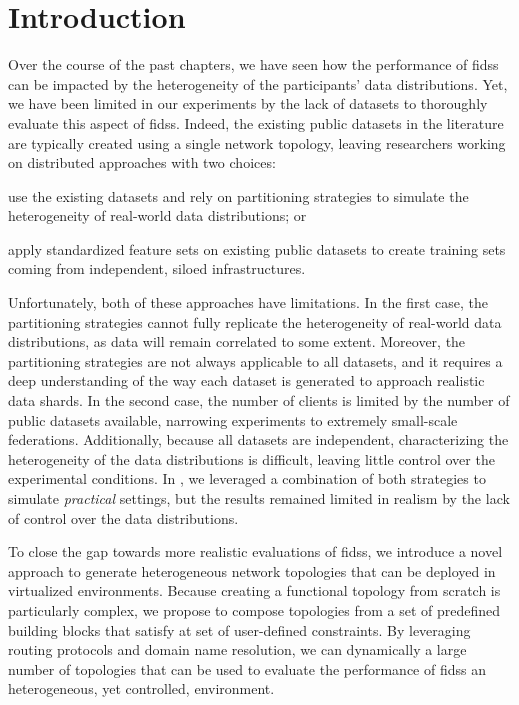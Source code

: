 \section{Introduction\label{sec:topologies.intro}}



Over the course of the past chapters, we have seen how the performance of \glspl{fids} can be impacted by the heterogeneity of the participants' data distributions.
Yet, we have been limited in our experiments by the lack of datasets to thoroughly evaluate this aspect of \glspl{fids}.
Indeed, the existing public datasets in the literature are typically created using a single network topology, leaving researchers working on distributed approaches with two choices:
\begin{enumerate*}[(i)]
    \item use the existing datasets and rely on partitioning strategies to simulate the heterogeneity of real-world data distributions; or
    \item apply standardized feature sets on existing public datasets to create training sets coming from independent, siloed infrastructures.
\end{enumerate*}

Unfortunately, both of these approaches have limitations.
In the first case, the partitioning strategies cannot fully replicate the heterogeneity of real-world data distributions, as data will remain correlated to some extent.
Moreover, the partitioning strategies are not always applicable to all datasets, and it requires a deep understanding of the way each dataset is generated to approach realistic data shards.
In the second case, the number of clients is limited by the number of public datasets available, narrowing experiments to extremely small-scale federations.
Additionally, because all datasets are independent, characterizing the heterogeneity of the data distributions is difficult, leaving little control over the experimental conditions.
In , we leveraged a combination of both strategies to simulate \emph{practical}  settings, but the results remained limited in realism by the lack of control over the data distributions.

To close the gap towards more realistic evaluations of \glspl{fids}, we introduce a novel approach to generate heterogeneous network topologies that can be deployed in virtualized environments.
Because creating a functional topology from scratch is particularly complex, we propose to compose topologies from a set of predefined building blocks that satisfy at set of user-defined constraints.
By leveraging routing protocols and domain name resolution, we can dynamically a large number of topologies that can be used to evaluate the performance of \glspl{fids} an heterogeneous, yet controlled, environment.


